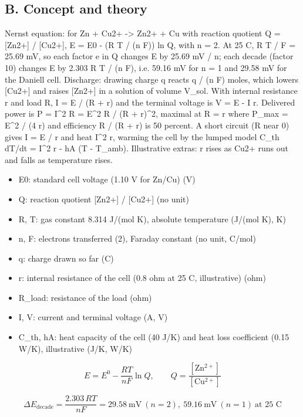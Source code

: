 \documentclass[11pt,a4paper]{article}
\begin{document}
\subsection*{B. Concept and theory}
Nernst equation: for Zn + Cu2+ -\textgreater{} Zn2+ + Cu with reaction quotient Q = [Zn2+] / [Cu2+], E = E0 - (R T / (n F)) ln Q, with n = 2. At 25 C, R T / F = 25.69 mV, so each factor e in Q changes E by 25.69 mV / n; each decade (factor 10) changes E by 2.303 R T / (n F), i.e. 59.16 mV for n = 1 and 29.58 mV for the Daniell cell. Discharge: drawing charge q reacts q / (n F) moles, which lowers [Cu2+] and raises [Zn2+] in a solution of volume V\_sol. With internal resistance r and load R, I = E / (R + r) and the terminal voltage is V = E - I r. Delivered power is P = I\textasciicircum{}2 R = E\textasciicircum{}2 R / (R + r)\textasciicircum{}2, maximal at R = r where P\_max = E\textasciicircum{}2 / (4 r) and efficiency R / (R + r) is 50 percent. A short circuit (R near 0) gives I = E / r and heat I\textasciicircum{}2 r, warming the cell by the lumped model C\_th dT/dt = I\textasciicircum{}2 r - hA (T - T\_amb). Illustrative extras: r rises as Cu2+ runs out and falls as temperature rises.

\begin{itemize}[nosep]
\item E0: standard cell voltage (1.10 V for Zn/Cu) (V)
\item Q: reaction quotient [Zn2+] / [Cu2+] (no unit)
\item R, T: gas constant 8.314 J/(mol K), absolute temperature (J/(mol K), K)
\item n, F: electrons transferred (2), Faraday constant (no unit, C/mol)
\item q: charge drawn so far (C)
\item r: internal resistance of the cell (0.8 ohm at 25 C, illustrative) (ohm)
\item R\_load: resistance of the load (ohm)
\item I, V: current and terminal voltage (A, V)
\item C\_th, hA: heat capacity of the cell (40 J/K) and heat loss coefficient (0.15 W/K), illustrative (J/K, W/K)
\end{itemize}

\begin{equation*}
E=E^{0}-\frac{RT}{nF}\ln Q,\qquad Q=\frac{[\mathrm{Zn^{2+}}]}{[\mathrm{Cu^{2+}}]}
\end{equation*}

\begin{equation*}
\Delta E_{\text{decade}}=\frac{2.303\,RT}{nF}=29.58\ \mathrm{mV}\ (n=2),\ 59.16\ \mathrm{mV}\ (n=1)\ \text{at 25 C}
\end{equation*}
\end{document}
